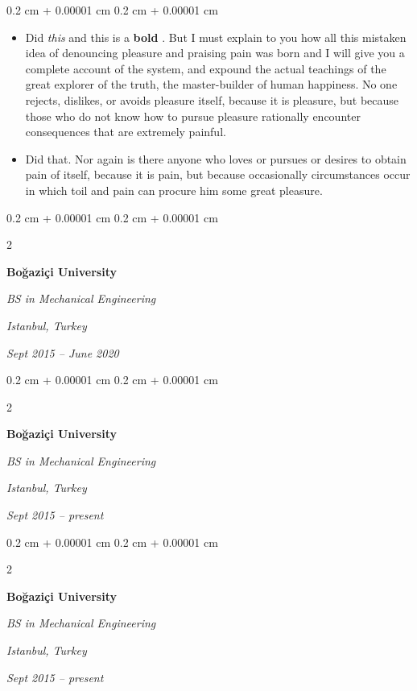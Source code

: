 \documentclass[10pt, letterpaper]{article}
\newenvironment{highlights}{
    \begin{itemize}[
        topsep=0.10 cm,
        parsep=0.10 cm,
        partopsep=0pt,
        itemsep=0pt,
        leftmargin=0.4 cm + 10pt
    ]
}{
    \end{itemize}
} %
\newenvironment{onecolentry}{
    \begin{adjustwidth}{
        0.2 cm + 0.00001 cm
    }{
        0.2 cm + 0.00001 cm
    }
}{
    \end{adjustwidth}
} %
\newenvironment{twocolentry}[2][]{
    \onecolentry
    \def\secondColumn{#2}
    \setcolumnwidth{\fill, 4.5 cm}
    \begin{paracol}{2}
}{
    \switchcolumn \raggedleft \secondColumn
    \end{paracol}
    \endonecolentry
} %
\let\hrefWithoutArrow\href
\renewcommand{\href}[2]{\hrefWithoutArrow{#1}{\ifthenelse{\equal{#2}{}}{ }{#2 }\raisebox{.15ex}{\footnotesize \faExternalLink*}}}
\begin{document}
        \vspace{0.10 cm}
        \begin{onecolentry}
            \begin{highlights}
                \item Did \textit{this} and this is a \textbf{bold} \href{https://example.com}{link}. But I must explain to you how all this mistaken idea of denouncing pleasure and praising pain was born and I will give you a complete account of the system, and expound the actual teachings of the great explorer of the truth, the master-builder of human happiness. No one rejects, dislikes, or avoids pleasure itself, because it is pleasure, but because those who do not know how to pursue pleasure rationally encounter consequences that are extremely painful.
                \item Did that. Nor again is there anyone who loves or pursues or desires to obtain pain of itself, because it is pain, but because occasionally circumstances occur in which toil and pain can procure him some great pleasure.
            \end{highlights}
        \end{onecolentry}


        \vspace{0.2 cm}

        \begin{twocolentry}{
        \textit{Istanbul, Turkey}    
            
        \textit{Sept 2015 – June 2020}}
            \textbf{Boğaziçi University}

            \textit{BS in Mechanical Engineering}
        \end{twocolentry}



        \vspace{0.2 cm}

        \begin{twocolentry}{
        \textit{Istanbul, Turkey}    
            
        \textit{Sept 2015 – present}}
            \textbf{Boğaziçi University}

            \textit{BS in Mechanical Engineering}
        \end{twocolentry}



        \vspace{0.2 cm}

        \begin{twocolentry}{
        \textit{Istanbul, Turkey}    
            
        \textit{Sept 2015 – present}}
            \textbf{Boğaziçi University}

            \textit{BS in Mechanical Engineering}
        \end{twocolentry}
\end{document}
